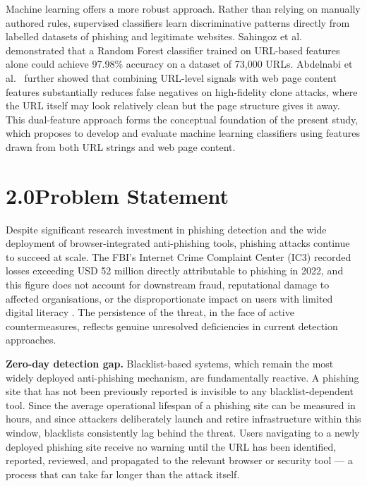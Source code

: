 \documentclass[11pt,letterpaper]{article}
\begin{document}
Machine learning offers a more robust approach. Rather than relying on manually authored rules, supervised classifiers learn discriminative patterns directly from labelled datasets of phishing and legitimate websites. Sahingoz et al.\ \cite{sahingoz2019} demonstrated that a Random Forest classifier trained on URL-based features alone could achieve 97.98\% accuracy on a dataset of 73,000 URLs. Abdelnabi et al.\ \cite{abdelnabi2020} further showed that combining URL-level signals with web page content features substantially reduces false negatives on high-fidelity clone attacks, where the URL itself may look relatively clean but the page structure gives it away. This dual-feature approach forms the conceptual foundation of the present study, which proposes to develop and evaluate machine learning classifiers using features drawn from both URL strings and web page content.

\newpage
\section*{2.0\quad Problem Statement}

Despite significant research investment in phishing detection and the wide deployment of browser-integrated anti-phishing tools, phishing attacks continue to succeed at scale. The FBI's Internet Crime Complaint Center (IC3) recorded losses exceeding USD 52 million directly attributable to phishing in 2022, and this figure does not account for downstream fraud, reputational damage to affected organisations, or the disproportionate impact on users with limited digital literacy \cite{ic3_2022}. The persistence of the threat, in the face of active countermeasures, reflects genuine unresolved deficiencies in current detection approaches.

\textbf{Zero-day detection gap.} Blacklist-based systems, which remain the most widely deployed anti-phishing mechanism, are fundamentally reactive. A phishing site that has not been previously reported is invisible to any blacklist-dependent tool. Since the average operational lifespan of a phishing site can be measured in hours, and since attackers deliberately launch and retire infrastructure within this window, blacklists consistently lag behind the threat. Users navigating to a newly deployed phishing site receive no warning until the URL has been identified, reported, reviewed, and propagated to the relevant browser or security tool --- a process that can take far longer than the attack itself.
\end{document}
